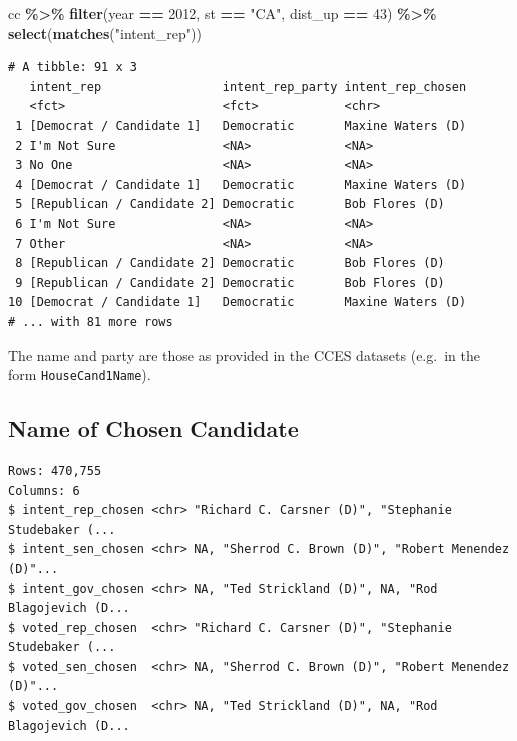 \documentclass[10pt,article,oneside]{memoir}
\theoremstyle{definition}
\newenvironment{Shaded}{\begin{snugshade}}{\end{snugshade}}
\newcommand{\DecValTok}[1]{\textcolor[rgb]{0.00,0.00,0.81}{#1}}
\newcommand{\KeywordTok}[1]{\textcolor[rgb]{0.13,0.29,0.53}{\textbf{#1}}}
\newcommand{\NormalTok}[1]{#1}
\newcommand{\OperatorTok}[1]{\textcolor[rgb]{0.81,0.36,0.00}{\textbf{#1}}}
\newcommand{\StringTok}[1]{\textcolor[rgb]{0.31,0.60,0.02}{#1}}
\begin{document}
\begin{Shaded}
\begin{Highlighting}[]
\NormalTok{cc }\OperatorTok{\%\textgreater{}\%}\StringTok{ }
\StringTok{  }\KeywordTok{filter}\NormalTok{(year }\OperatorTok{==}\StringTok{ }\DecValTok{2012}\NormalTok{, st }\OperatorTok{==}\StringTok{ "CA"}\NormalTok{, dist\_up }\OperatorTok{==}\StringTok{ }\DecValTok{43}\NormalTok{) }\OperatorTok{\%\textgreater{}\%}\StringTok{ }
\StringTok{  }\KeywordTok{select}\NormalTok{(}\KeywordTok{matches}\NormalTok{(}\StringTok{"intent\_rep"}\NormalTok{)) }
\end{Highlighting}
\end{Shaded}

\begin{verbatim}
# A tibble: 91 x 3
   intent_rep                 intent_rep_party intent_rep_chosen
   <fct>                      <fct>            <chr>            
 1 [Democrat / Candidate 1]   Democratic       Maxine Waters (D)
 2 I'm Not Sure               <NA>             <NA>             
 3 No One                     <NA>             <NA>             
 4 [Democrat / Candidate 1]   Democratic       Maxine Waters (D)
 5 [Republican / Candidate 2] Democratic       Bob Flores (D)   
 6 I'm Not Sure               <NA>             <NA>             
 7 Other                      <NA>             <NA>             
 8 [Republican / Candidate 2] Democratic       Bob Flores (D)   
 9 [Republican / Candidate 2] Democratic       Bob Flores (D)   
10 [Democrat / Candidate 1]   Democratic       Maxine Waters (D)
# ... with 81 more rows
\end{verbatim}

The name and party are those as provided in the CCES datasets (e.g.~in
the form \texttt{HouseCand1Name}).

\hypertarget{name-of-chosen-candidate}{%
\subsection{Name of Chosen Candidate}\label{name-of-chosen-candidate}}

\begin{verbatim}
Rows: 470,755
Columns: 6
$ intent_rep_chosen <chr> "Richard C. Carsner (D)", "Stephanie Studebaker (...
$ intent_sen_chosen <chr> NA, "Sherrod C. Brown (D)", "Robert Menendez (D)"...
$ intent_gov_chosen <chr> NA, "Ted Strickland (D)", NA, "Rod Blagojevich (D...
$ voted_rep_chosen  <chr> "Richard C. Carsner (D)", "Stephanie Studebaker (...
$ voted_sen_chosen  <chr> NA, "Sherrod C. Brown (D)", "Robert Menendez (D)"...
$ voted_gov_chosen  <chr> NA, "Ted Strickland (D)", NA, "Rod Blagojevich (D...
\end{verbatim}
\end{document}
